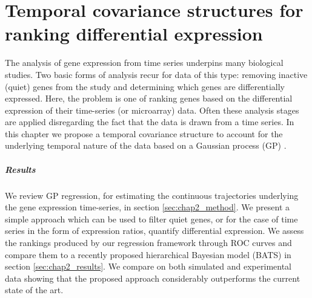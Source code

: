 
\chapter[Temporal covariance structures for ranking differential expression]{Temporal covariance structures for ranking differential expression} \label{chap2:GP}

\ifpdf
    \graphicspath{{Chapter2/Chapter2Figs/PNG/}{Chapter2/Chapter2Figs/PDF/}{Chapter2/Chapter2Figs/}}
\else
    \graphicspath{{Chapter2/Chapter2Figs/EPS/}{Chapter2/Chapter2Figs/}}
\fi




    The analysis of gene expression from time series underpins many biological studies.
    Two basic forms of analysis recur for data of this type: removing inactive (quiet) genes from the study and determining which genes are differentially expressed.
    Here, the problem is one of ranking genes based on the differential expression of their time-series (or microarray) data.   
    Often these analysis stages are applied disregarding the fact that the data is drawn from a time series.
    In this chapter we propose a temporal covariance structure to account for the underlying temporal nature of the data based on a Gaussian process (GP) \citep{Kalaitzis:simple11}.


    \paragraph{Results} %
      We review GP regression, for estimating the continuous trajectories underlying the gene expression time-series, in section \ref{sec:chap2_method}.
      We present a simple approach which can be used to filter quiet genes, or for the case of time series in the form of expression ratios, quantify differential expression.
      We assess the rankings produced by our regression framework through ROC curves and compare them to a recently proposed hierarchical Bayesian model (BATS) in section \ref{sec:chap2_results}.
      We compare on both simulated and experimental data showing that the proposed approach considerably outperforms the current state of the art.


